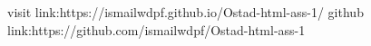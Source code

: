 visit link:https://ismailwdpf.github.io/Ostad-html-ass-1/
github link:https://github.com/ismailwdpf/Ostad-html-ass-1
